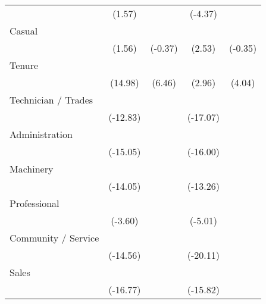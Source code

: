 {\begin{tabular}{l*{4}{c}}
                    &      (1.57)         &                     &     (-4.37)         &                     \\
[1em]
Casual              &                     &                     &            \sym{*}  &                     \\
                    &      (1.56)         &     (-0.37)         &      (2.53)         &     (-0.35)         \\
[1em]
Tenure              &            \sym{***}&            \sym{***}&            \sym{**} &            \sym{***}\\
                    &     (14.98)         &      (6.46)         &      (2.96)         &      (4.04)         \\
[1em]
Technician / Trades &            \sym{***}&                     &            \sym{***}&                     \\
                    &    (-12.83)         &                     &    (-17.07)         &                     \\
[1em]
Administration      &            \sym{***}&                     &            \sym{***}&                     \\
                    &    (-15.05)         &                     &    (-16.00)         &                     \\
[1em]
Machinery           &            \sym{***}&                     &            \sym{***}&                     \\
                    &    (-14.05)         &                     &    (-13.26)         &                     \\
[1em]
Professional        &            \sym{***}&                     &            \sym{***}&                     \\
                    &     (-3.60)         &                     &     (-5.01)         &                     \\
[1em]
Community / Service &            \sym{***}&                     &            \sym{***}&                     \\
                    &    (-14.56)         &                     &    (-20.11)         &                     \\
[1em]
Sales               &            \sym{***}&                     &            \sym{***}&                     \\
                    &    (-16.77)         &                     &    (-15.82)         &                     \\

\end{tabular}}

